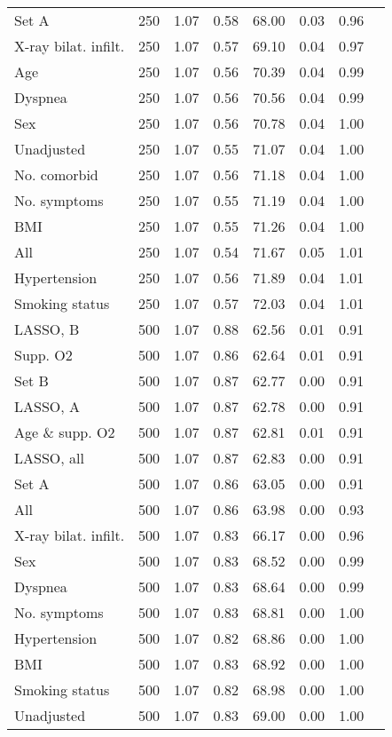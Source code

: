 \documentclass{article}
\begin{document}
{\begin{longtable}{lccccccc}
Set A & 250 & 1.07 & 0.58 & 68.00 & 0.03 & 0.96\\
X-ray bilat. infilt. & 250 & 1.07 & 0.57 & 69.10 & 0.04 & 0.97\\
Age & 250 & 1.07 & 0.56 & 70.39 & 0.04 & 0.99\\
Dyspnea & 250 & 1.07 & 0.56 & 70.56 & 0.04 & 0.99\\
Sex & 250 & 1.07 & 0.56 & 70.78 & 0.04 & 1.00\\
Unadjusted & 250 & 1.07 & 0.55 & 71.07 & 0.04 & 1.00\\
No. comorbid & 250 & 1.07 & 0.56 & 71.18 & 0.04 & 1.00\\
No. symptoms & 250 & 1.07 & 0.55 & 71.19 & 0.04 & 1.00\\
BMI & 250 & 1.07 & 0.55 & 71.26 & 0.04 & 1.00\\
All & 250 & 1.07 & 0.54 & 71.67 & 0.05 & 1.01\\
Hypertension & 250 & 1.07 & 0.56 & 71.89 & 0.04 & 1.01\\
Smoking status & 250 & 1.07 & 0.57 & 72.03 & 0.04 & 1.01\\ \midrule
LASSO, B & 500 & 1.07 & 0.88 & 62.56 & 0.01 & 0.91\\
Supp. O2 & 500 & 1.07 & 0.86 & 62.64 & 0.01 & 0.91\\
Set B & 500 & 1.07 & 0.87 & 62.77 & 0.00 & 0.91\\
LASSO, A & 500 & 1.07 & 0.87 & 62.78 & 0.00 & 0.91\\
Age \& supp. O2 & 500 & 1.07 & 0.87 & 62.81 & 0.01 & 0.91\\
LASSO, all & 500 & 1.07 & 0.87 & 62.83 & 0.00 & 0.91\\
Set A & 500 & 1.07 & 0.86 & 63.05 & 0.00 & 0.91\\
All & 500 & 1.07 & 0.86 & 63.98 & 0.00 & 0.93\\
X-ray bilat. infilt. & 500 & 1.07 & 0.83 & 66.17 & 0.00 & 0.96\\
Sex & 500 & 1.07 & 0.83 & 68.52 & 0.00 & 0.99\\
Dyspnea & 500 & 1.07 & 0.83 & 68.64 & 0.00 & 0.99\\
No. symptoms & 500 & 1.07 & 0.83 & 68.81 & 0.00 & 1.00\\
Hypertension & 500 & 1.07 & 0.82 & 68.86 & 0.00 & 1.00\\
BMI & 500 & 1.07 & 0.83 & 68.92 & 0.00 & 1.00\\
Smoking status & 500 & 1.07 & 0.82 & 68.98 & 0.00 & 1.00\\
Unadjusted & 500 & 1.07 & 0.83 & 69.00 & 0.00 & 1.00\\

\end{longtable}}
\end{document}
